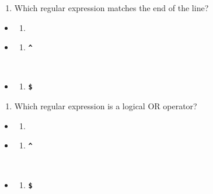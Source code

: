 \documentclass[
  letterpaper,
  DIV=11,
  numbers=noendperiod]{scrreprt}
\providecommand{\tightlist}{%
  \setlength{\itemsep}{0pt}\setlength{\parskip}{0pt}}
\begin{document}
\begin{enumerate}
\def\labelenumi{\arabic{enumi}.}
\setcounter{enumi}{9}
\tightlist
\item
  Which regular expression matches the end of the line?
\end{enumerate}

\begin{itemize}
\tightlist
\item
  \begin{enumerate}
  \def\labelenumi{(\Alph{enumi})}
  \tightlist
  \item
    \textbf{\texttt{\textbar{}}}\strut \\
  \end{enumerate}
\item
  \begin{enumerate}
  \def\labelenumi{(\Alph{enumi})}
  \setcounter{enumi}{1}
  \tightlist
  \item
    \textbf{\texttt{\^{}}}\strut \\
  \end{enumerate}
\item
  \begin{enumerate}
  \def\labelenumi{(\Alph{enumi})}
  \setcounter{enumi}{2}
  \tightlist
  \item
    \textbf{\texttt{\$}}
  \end{enumerate}
\end{itemize}

\begin{enumerate}
\def\labelenumi{\arabic{enumi}.}
\setcounter{enumi}{10}
\tightlist
\item
  Which regular expression is a logical OR operator?
\end{enumerate}

\begin{itemize}
\tightlist
\item
  \begin{enumerate}
  \def\labelenumi{(\Alph{enumi})}
  \tightlist
  \item
    \textbf{\texttt{\textbar{}}}\strut \\
  \end{enumerate}
\item
  \begin{enumerate}
  \def\labelenumi{(\Alph{enumi})}
  \setcounter{enumi}{1}
  \tightlist
  \item
    \textbf{\texttt{\^{}}}\strut \\
  \end{enumerate}
\item
  \begin{enumerate}
  \def\labelenumi{(\Alph{enumi})}
  \setcounter{enumi}{2}
  \tightlist
  \item
    \textbf{\texttt{\$}}
  \end{enumerate}
\end{itemize}
\end{document}
